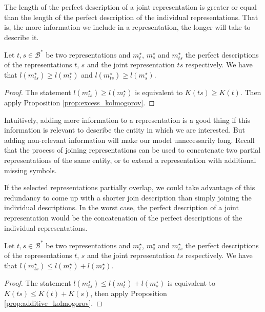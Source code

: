 The length of the perfect description of a joint representation is greater or equal than the length of the perfect description of the individual representations. That is, the more information we include in a representation, the longer will take to describe it. 

\begin{proposition}
\label{prop:joint_length}
Let $t,s \in \mathcal{B}^\ast$ be two representations and $m_{t}^{\star}$, $m_{s}^{\star}$ and $m_{ts}^{\star}$ the perfect descriptions of the representations $t$, $s$ and the joint representation $ts$ respectively. We have that $l \left( m_{ts}^{\star} \right) \geq l \left( m_{t}^{\star} \right)$ and $l \left( m_{ts}^{\star} \right) \geq l \left( m_{s}^{\star} \right)$.
\end{proposition}
\begin{proof}
The statement $l \left( m_{ts}^{\star} \right) \geq l \left( m_{t}^{\star} \right)$ is equivalent to $K(ts) \geq K(t)$. Then apply Proposition \ref{prop:excess_kolmogorov}.
\end{proof}

Intuitively, adding more information to a representation is a good thing if this information is relevant to describe the entity in which we are interested. But adding non-relevant information will make our model unnecessarily long. Recall that the process of joining representations can be used to concatenate two partial representations of the same entity, or to extend a representation with additional missing symbols.

If the selected representations partially overlap, we could take advantage of this redundancy to come up with a shorter join description than simply joining the individual descriptions. In the worst case, the perfect description of a joint representation would be the concatenation of the perfect descriptions of the individual representations.

\begin{proposition}
\label{prop:joint_sum}
Let $t,s \in \mathcal{B}^\ast$ be two representations and $m_{t}^{\star}$, $m_{s}^{\star}$ and $m_{ts}^{\star}$ the perfect descriptions of the representations $t$, $s$ and the joint representation $ts$ respectively. We have that $l \left( m_{ts}^{\star} \right) \leq l \left( m_{t}^{\star} \right) + l \left( m_{s}^{\star} \right)$.
\end{proposition}
\begin{proof}
The statement $l \left( m_{ts}^{\star} \right) \leq l \left( m_{t}^{\star} \right) + l \left( m_{s}^{\star} \right)$ is equivalent to $K(ts) \leq K(t) + K(s)$, then apply Proposition \ref{prop:additive_kolmogorov}.
\end{proof}

